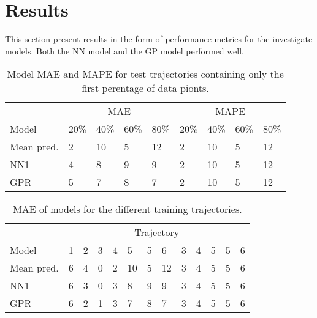 
\chapter{Results}
\label{cha:results}
This section present results in the form of performance metrics for the investigate models. Both the NN model and the GP model performed well.

\begin{table}[H]
  \centering
  \caption{Model MAE and MAPE for test trajectories containing only the first perentage of data pionts.}
  \label{tbl:models-mae-and-mape}
  \begin{tabular}{l | l | l | l | l || l | l | l | l }
    & \multicolumn{4}{c}{MAE} & \multicolumn{4}{c}{MAPE} \\
    Model      & 20\% & 40\% & 60\% & 80\% & 20\% & 40\% & 60\% & 80\% \\
    \hline
    Mean pred. & 2 & 10 & 5 & 12  & 2 & 10 & 5 & 12 \\
    NN1        & 4 &  8 & 9 &  9  & 2 & 10 & 5 & 12 \\
    GPR        & 5 &  7 & 8 &  7  & 2 & 10 & 5 & 12 \\
  \end{tabular}
\end{table}

\begin{table}[H]
  \centering
  \caption{MAE of models for the different training trajectories.}
  \label{tbl:model-mae-of-trajs}
  \begin{tabular}{ l | l | l | l | l | l | l | l | l | l | l | l | l }
    & \multicolumn{12}{c}{Trajectory} \\
    Model       & 1 & 2 & 3 & 4 & 5  & 5 & 6 & 3 & 4 & 5  & 5 & 6 \\
    \hline
    Mean pred.  & 6 & 4 & 0 & 2 & 10 & 5 & 12 & 3 & 4 & 5  & 5 & 6 \\
    NN1         & 6 & 3 & 0 & 3 &  8 & 9 &  9 & 3 & 4 & 5  & 5 & 6 \\
    GPR         & 6 & 2 & 1 & 3 &  7 & 8 &  7 & 3 & 4 & 5  & 5 & 6 \\
  \end{tabular}
\end{table}

